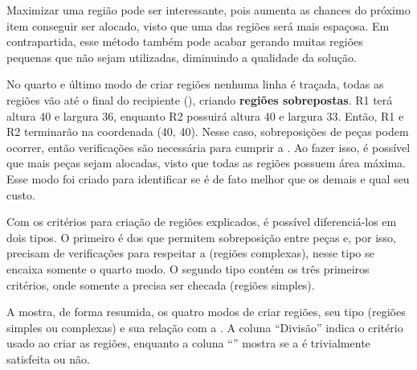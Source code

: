 

Maximizar uma região pode ser interessante, pois aumenta as chances do próximo item conseguir ser
alocado, visto que uma das regiões será mais espaçosa.
Em contrapartida, esse método também pode acabar gerando muitas regiões pequenas que não sejam
utilizadas, diminuindo a qualidade da solução.

No quarto e último modo de criar regiões nenhuma linha é traçada, todas as regiões vão até o final
do recipiente (), criando \textbf{regiões sobrepostas}.
R1 terá altura 40 e largura 36, enquanto R2 possuirá altura 40 e largura 33.
Então, R1 e R2 terminarão na coordenada (40, 40).
Nesse caso, sobreposições de peças podem ocorrer, então verificações são necessária para cumprir
a .
Ao fazer isso, é possível que mais peças sejam alocadas, visto que todas as regiões possuem área
máxima.
Esse modo foi criado para identificar se é de fato melhor que os demais e qual seu custo.



Com os critérios para criação de regiões explicados, é possível diferenciá-los em dois tipos.
O primeiro é dos que permitem sobreposição entre peças e, por isso, precisam de verificações para
respeitar a  (regiões complexas), nesse tipo se encaixa somente o quarto modo.
O segundo tipo contém os três primeiros critérios, onde somente a  precisa ser checada
(regiões simples).

A  mostra, de forma resumida, os quatro modos de criar regiões,
seu tipo (regiões simples ou complexas) e sua relação com a .
A coluna “Divisão” indica o critério usado ao criar as regiões, enquanto a coluna “”
mostra se a  é trivialmente satisfeita ou não.

